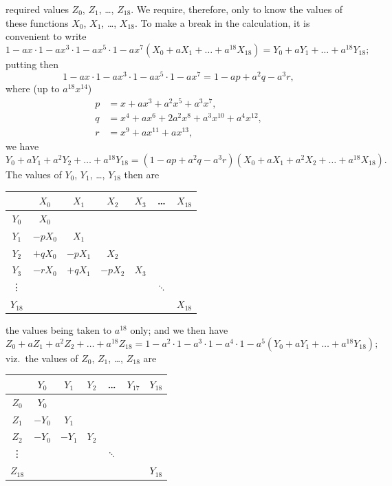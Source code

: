 \documentclass[11pt,a4paper]{article}
\begin{document}
\clearpage
required values $Z_0$, $Z_1$, \dots, $Z_{18}$. We require, therefore, only to know the values of these functions $X_0$, $X_1$, \dots, $X_{18}$. To make a break in the calculation, it is convenient to write
\[
1 - ax \cdot 1 - ax^3 \cdot 1 - ax^5 \cdot 1 - ax^7 (X_0 + aX_1 + \dots + a^{18}X_{18}) = Y_0 + aY_1 + \dots + a^{18}Y_{18};
\]
putting then
\[
1 - ax \cdot 1 - ax^3 \cdot 1 - ax^5 \cdot 1 - ax^7 = 1 - ap + a^2q - a^3r,
\]
where (up to $a^{18}x^{14}$)
\begin{align*}
p &= x + ax^3 + a^2x^5 + a^3x^7, \\
q &= x^4 + ax^6 + 2a^2x^8 + a^3x^{10} + a^4x^{12}, \\
r &= x^9 + ax^{11} + ax^{13},
\end{align*}
we have
\[
Y_0 + aY_1 + a^2Y_2 + \dots + a^{18}Y_{18} = (1 - ap + a^2q - a^3r)(X_0 + aX_1 + a^2X_2 + \dots + a^{18}X_{18}).
\]
The values of $Y_0$, $Y_1$, \dots, $Y_{18}$ then are
\begin{center}
\begin{tabular}{c|cccccc}
& $X_0$ & $X_1$ & $X_2$ & $X_3$ & \dots & $X_{18}$ \\
\hline
$Y_0$ & $X_0$ & & & & & \\
$Y_1$ & $-pX_0$ & $X_1$ & & & & \\
$Y_2$ & $+qX_0$ & $-pX_1$ & $X_2$ & & & \\
$Y_3$ & $-rX_0$ & $+qX_1$ & $-pX_2$ & $X_3$ & & \\
\vdots & & & & & $\ddots$ & \\
$Y_{18}$ & & & & & & $X_{18}$
\end{tabular}
\end{center}
the values being taken to $a^{18}$ only; and we then have
\[
Z_0 + aZ_1 + a^2Z_2 + \dots + a^{18}Z_{18} = 1 - a^2 \cdot 1 - a^3 \cdot 1 - a^4 \cdot 1 - a^5 (Y_0 + aY_1 + \dots + a^{18}Y_{18});
\]
viz.\ the values of $Z_0$, $Z_1$, \dots, $Z_{18}$ are
\begin{center}
\begin{tabular}{c|cccccc}
& $Y_0$ & $Y_1$ & $Y_2$ & \dots & $Y_{17}$ & $Y_{18}$ \\
\hline
$Z_0$ & $Y_0$ & & & & & \\
$Z_1$ & $-Y_0$ & $Y_1$ & & & & \\
$Z_2$ & $-Y_0$ & $-Y_1$ & $Y_2$ & & & \\
\vdots & & & & $\ddots$ & & \\
$Z_{18}$ & & & & & & $Y_{18}$
\end{tabular}
\end{center}
\end{document}
